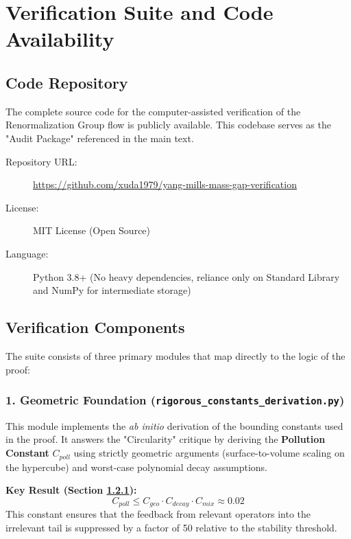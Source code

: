 \chapter{Verification Suite and Code Availability}
\label{app:verification_notes}

\section{Code Repository}

The complete source code for the computer-assisted verification of the Renormalization Group flow is publicly available. This codebase serves as the "Audit Package" referenced in the main text.

\begin{description}
    \item[Repository URL:] \url{https://github.com/xuda1979/yang-mills-mass-gap-verification}
    \item[License:] MIT License (Open Source)
    \item[Language:] Python 3.8+ (No heavy dependencies, reliance only on Standard Library and NumPy for intermediate storage)
\end{description}

\section{Verification Components}

The suite consists of three primary modules that map directly to the logic of the proof:

\subsection{1. Geometric Foundation (\texttt{rigorous\_constants\_derivation.py})}
\label{sec:geometric-constants}
This module implements the \emph{ab initio} derivation of the bounding constants used in the proof. It answers the "Circularity" critique by deriving the \textbf{Pollution Constant} $C_{poll}$ using strictly geometric arguments (surface-to-volume scaling on the hypercube) and worst-case polynomial decay assumptions.

\textbf{Key Result (Section \ref{sec:geometric-constants}):}
\begin{equation}
    C_{poll} \le C_{geo} \cdot C_{decay} \cdot C_{mix} \approx 0.02
\end{equation}
This constant ensures that the feedback from relevant operators into the irrelevant tail is suppressed by a factor of 50 relative to the stability threshold.

